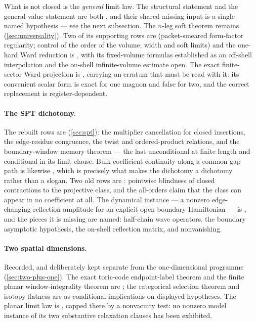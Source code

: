 What is not closed is the \emph{general} limit law. The structural statement
and the general value statement are both \statusSketch{}, and their shared
missing input is a single named hypothesis --- see the next subsection. The
$n$-leg soft theorem remains \statusConjecture{}
(\cref{sec:universality}). Two of its supporting rows are
\statusConjecture{} (packet-smeared form-factor regularity; control of the
order of the volume, width and soft limits) and the one-hard Ward reduction
is \statusSketch{}, with its fixed-volume formulas established as an
off-shell interpolation and the on-shell infinite-volume estimate open. The
exact finite-sector Ward projection is \statusProved{}, carrying an erratum
that must be read with it: its convenient scalar form is exact for one magnon
and false for two, and the correct replacement is register-dependent.

\paragraph{The SPT dichotomy.}
The rebuilt rows are \statusProved{} (\cref{sec:spt}): the multiplier
cancellation for closed insertions, the edge-residue congruence, the twist and
ordered-product relations, and the boundary-window memory theorem --- the last
unconditional at finite length and conditional in its limit clause. Bulk
coefficient continuity along a common-gap path is likewise \statusProved{},
which is precisely what makes the dichotomy a dichotomy rather than a slogan.
Two old rows are \statusRefuted{}: pointwise blindness of closed contractions
to the projective class, and the all-orders claim that the class can appear in
no coefficient at all. The dynamical instance --- a nonzero edge-changing
reflection amplitude for an explicit open boundary Hamiltonian --- is
\statusConjecture{}, and the pieces it is missing are named: half-chain wave
operators, the boundary asymptotic hypothesis, the on-shell reflection matrix,
and nonvanishing.

\paragraph{Two spatial dimensions.}
Recorded, and deliberately kept separate from the one-dimensional programme
(\cref{sec:two-plus-one}). The exact toric-code endpoint-label theorem and the
finite planar window-integrality theorem are \statusProved{}; the categorical
selection theorem and isotopy flatness are \statusProved{} as conditional
implications on displayed hypotheses. The planar limit law is
\statusSketch{}, capped there by a nonvacuity test: no nonzero model instance
of its two substantive relaxation clauses has been exhibited.

